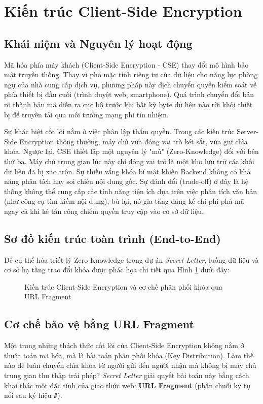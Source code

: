 \section{Kiến trúc Client-Side Encryption}

\subsection{Khái niệm và Nguyên lý hoạt động}
Mã hóa phía máy khách (Client-Side Encryption - CSE) thay đổi mô hình bảo mật truyền thống. Thay vì phó mặc tính riêng tư của dữ liệu cho năng lực phòng ngự của nhà cung cấp dịch vụ, phương pháp này dịch chuyển quyền kiểm soát về phía thiết bị đầu cuối (trình duyệt web, smartphone). Quá trình chuyển đổi bản rõ thành bản mã diễn ra cục bộ trước khi bất kỳ byte dữ liệu nào rời khỏi thiết bị để truyền tải qua môi trường mạng phi tín nhiệm.

Sự khác biệt cốt lõi nằm ở việc phân lập thẩm quyền. Trong các kiến trúc Server-Side Encryption thông thường, máy chủ vừa đóng vai trò két sắt, vừa giữ chìa khóa. Ngược lại, CSE thiết lập một nguyên lý "mù" (Zero-Knowledge) đối với bên thứ ba. Máy chủ trung gian lúc này chỉ đóng vai trò là một kho lưu trữ các khối dữ liệu đã bị xáo trộn. Sự thiếu vắng khóa bí mật khiến Backend không có khả năng phân tích hay soi chiếu nội dung gốc. Sự đánh đổi (trade-off) ở đây là hệ thống không thể cung cấp các tính năng tiện ích dựa trên việc phân tích văn bản (như công cụ tìm kiếm nội dung), bù lại, nó gia tăng đáng kể chi phí phá mã ngay cả khi kẻ tấn công chiếm quyền truy cập vào cơ sở dữ liệu.

\subsection{Sơ đồ kiến trúc toàn trình (End-to-End)}
Để cụ thể hóa triết lý Zero-Knowledge trong dự án \textit{Secret Letter}, luồng dữ liệu và cơ sở hạ tầng trao đổi khóa được phác họa chi tiết qua Hình \ref{fig:cse_arch} dưới đây:

\begin{figure}[H]
\centering
\resizebox{\textwidth}{!}{

}
\caption{Kiến trúc Client-Side Encryption và cơ chế phân phối khóa qua URL Fragment}
\label{fig:cse_arch}
\end{figure}

\subsection{Cơ chế bảo vệ bằng URL Fragment}
Một trong những thách thức cốt lõi của Client-Side Encryption không nằm ở thuật toán mã hóa, mà là bài toán phân phối khóa (Key Distribution). Làm thế nào để luân chuyển chìa khóa từ người gửi đến người nhận mà không bị máy chủ trung gian thu thập trái phép? \textit{Secret Letter} giải quyết bài toán này bằng cách khai thác một đặc tính của giao thức web: \textbf{URL Fragment} (phần chuỗi ký tự nối sau ký hiệu \texttt{\#}).

